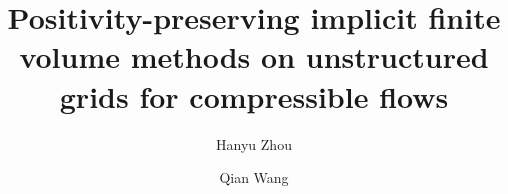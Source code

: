 \documentclass[review, 10pt]{elsarticle}
\begin{document}
	
\begin{frontmatter}
	
	

\title{Positivity-preserving implicit finite volume methods on unstructured grids for compressible flows}


\author[THU]{Hanyu Zhou}
\author[CSRC]{Qian Wang}

\address[THU]{Department of Engineering Mechanics, Tsinghua University, Beijing 100084, China}
\address[CSRC]{Mechanics Division, Beijing Computational Science Research Center, Beijing 100193, China}
	

\end{frontmatter}
\end{document}
